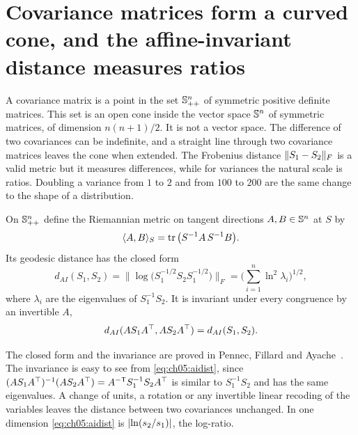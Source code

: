 
\section{Covariance matrices form a curved cone, and the affine-invariant distance measures ratios}\label{sec:ch05:spd}

A covariance matrix is a point in the set $\mathbb{S}^n_{++}$ of symmetric positive definite matrices. This set is an open cone inside the vector space $\mathbb{S}^n$ of symmetric matrices, of dimension $n(n+1)/2$. It is not a vector space. The difference of two covariances can be indefinite, and a straight line through two covariance matrices leaves the cone when extended. The Frobenius distance $\lVert S_1-S_2\rVert_F$ is a valid metric but it measures differences, while for variances the natural scale is ratios. Doubling a variance from $1$ to $2$ and from $100$ to $200$ are the same change to the shape of a distribution.

\begin{definition}\label{def:ch05:spd}
On $\mathbb{S}^n_{++}$ define the Riemannian metric on tangent directions $A,B\in\mathbb{S}^n$ at $S$ by
\begin{equation}\label{eq:ch05:aimetric}
\langle A,B\rangle_S=\operatorname{tr}\big(S^{-1}A\,S^{-1}B\big).
\end{equation}
Its geodesic distance has the closed form
\begin{equation}\label{eq:ch05:aidist}
d_{AI}(S_1,S_2)=\big\|\log\big(S_1^{-1/2}S_2S_1^{-1/2}\big)\big\|_F=\Big(\sum_{i=1}^n\ln^2\lambda_i\Big)^{1/2},
\end{equation}
where $\lambda_i$ are the eigenvalues of $S_1^{-1}S_2$. It is invariant under every congruence by an invertible $A$,
\begin{equation}\label{eq:ch05:aiinv}
d_{AI}(AS_1A^{\top},AS_2A^{\top})=d_{AI}(S_1,S_2).
\end{equation}
\end{definition}

The closed form and the invariance are proved in Pennec, Fillard and Ayache~\cite{pennec2006}. The invariance is easy to see from \eqref{eq:ch05:aidist}, since $(AS_1A^{\top})^{-1}(AS_2A^{\top})=A^{-\mathsf T}S_1^{-1}S_2A^{\top}$ is similar to $S_1^{-1}S_2$ and has the same eigenvalues. A change of units, a rotation or any invertible linear recoding of the variables leaves the distance between two covariances unchanged. In one dimension \eqref{eq:ch05:aidist} is $\lvert \ln(s_2/s_1)\rvert$, the log-ratio.


